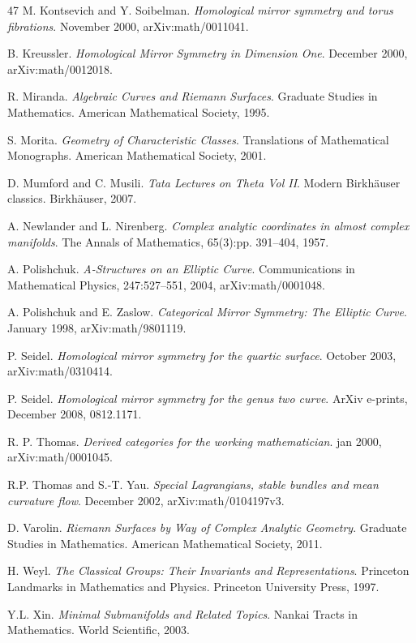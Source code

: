 \documentclass[11pt,a4paper]{article}
\theoremstyle{plain}
\theoremstyle{definition}
\begin{document}
\begin{thebibliography}{47}
 M. Kontsevich and Y. Soibelman. \emph{Homological mirror symmetry and torus fibrations}. November 2000, arXiv:math/0011041.

 B. Kreussler. \emph{Homological Mirror Symmetry in Dimension One}. December 2000, arXiv:math/0012018.

 R. Miranda. \emph{Algebraic Curves and Riemann Surfaces}. Graduate Studies in Mathematics. American Mathematical Society, 1995.

 S. Morita. \emph{Geometry of Characteristic Classes}. Translations of Mathematical Monographs. American Mathematical Society, 2001.

 D. Mumford and C. Musili. \emph{Tata Lectures on Theta Vol II}. Modern Birkhäuser classics. Birkhäuser, 2007.

 A. Newlander and L. Nirenberg. \emph{Complex analytic coordinates in almost complex manifolds}. The Annals of Mathematics, 65(3):pp. 391--404, 1957.

 A. Polishchuk. \emph{A-Structures on an Elliptic Curve}. Communications in Mathematical Physics, 247:527--551, 2004, arXiv:math/0001048.

 A. Polishchuk and E. Zaslow. \emph{Categorical Mirror Symmetry: The Elliptic Curve}. January 1998, arXiv:math/9801119.

 P. Seidel. \emph{Homological mirror symmetry for the quartic surface}. October 2003, arXiv:math/0310414.

 P. Seidel. \emph{Homological mirror symmetry for the genus two curve}. ArXiv e-prints, December 2008, 0812.1171.

 R. P. Thomas. \emph{Derived categories for the working mathematician}. jan 2000, arXiv:math/0001045.

 R.P. Thomas and S.-T. Yau. \emph{Special Lagrangians, stable bundles and mean curvature flow}. December 2002, arXiv:math/0104197v3.

 D. Varolin. \emph{Riemann Surfaces by Way of Complex Analytic Geometry}. Graduate Studies in Mathematics. American Mathematical Society, 2011.

 H. Weyl. \emph{The Classical Groups: Their Invariants and Representations}. Princeton Landmarks in Mathematics and Physics. Princeton University Press, 1997.

 Y.L. Xin. \emph{Minimal Submanifolds and Related Topics}. Nankai Tracts in Mathematics. World Scientific, 2003.


\end{thebibliography}
\end{document}
